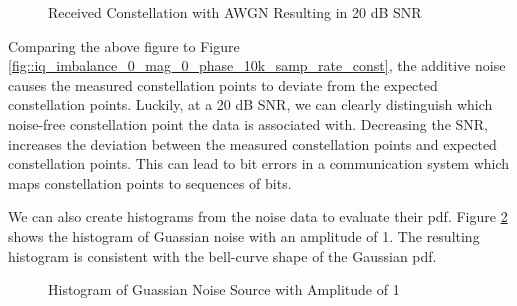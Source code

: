\documentclass{article}
\begin{document}
\begin{figure}[H]
	\centerline{}
	\caption{Received Constellation with AWGN Resulting in 20 dB SNR}
	\label{fig::noise_constellation_20dB_snr}
\end{figure}

Comparing the above figure to Figure \ref{fig::iq_imbalance_0_mag_0_phase_10k_samp_rate_const}, the additive noise causes the measured constellation points to deviate from the expected constellation points. Luckily, at a 20 dB SNR, we can clearly distinguish which noise-free constellation point the data is associated with. Decreasing the SNR, increases the deviation between the measured constellation points and expected constellation points. This can lead to bit errors in a communication system which maps constellation points to sequences of bits.

We can also create histograms from the noise data to evaluate their pdf. Figure \ref{fig::gaussian_noise_histogram} shows the histogram of Guassian noise with an amplitude of 1. The resulting histogram is consistent with the bell-curve shape of the Gaussian pdf.

\begin{figure}[H]
	\centerline{}
	\caption{Histogram of Guassian Noise Source with Amplitude of 1}
	\label{fig::gaussian_noise_histogram}
\end{figure}
\end{document}
